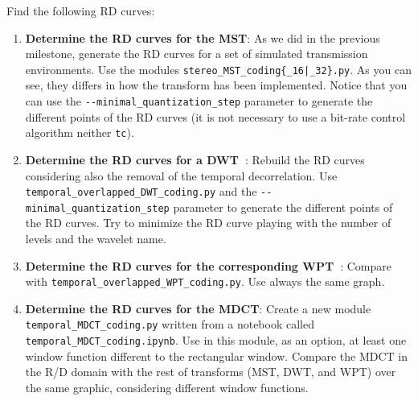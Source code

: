 
Find the following RD curves:

\begin{enumerate}

\item \textbf{Determine the RD curves for the MST}: As we did in the
  previous milestone, generate the RD curves for a set of simulated
  transmission environments. Use the modules
  \texttt{stereo\_MST\_coding\{\_16|\_32\}.py}. As you can see, they
  differs in how the transform has been implemented.  Notice that you
  can use the \verb|--minimal_quantization_step| parameter to generate
  the different points of the RD curves (it is not necessary to use a
  bit-rate control algorithm neither \texttt{tc}).

\item \textbf{Determine the RD curves for a
  DWT~\cite{lee2019pywavelets}}: Rebuild the RD curves considering
  also the removal of the temporal decorrelation. Use
  \verb|temporal_overlapped_DWT_coding.py| and the
  \verb|--minimal_quantization_step| parameter to generate the
  different points of the RD curves. Try to minimize the RD curve
  playing with the number of levels and the wavelet name.


\item \textbf{Determine the RD curves for the corresponding
  WPT~\cite{lee2019pywavelets}}: Compare with
  \verb|temporal_overlapped_WPT_coding.py|. Use always the same graph.

\item \textbf{Determine the RD curves for the MDCT}: Create a new
  module \verb|temporal_MDCT_coding.py| written from a notebook called
  \verb|temporal_MDCT_coding.ipynb|. Use in this module, as an option,
  at least one window function different to the rectangular
  window. Compare the MDCT in the R/D domain with the rest of
  transforms (MST, DWT, and WPT) over the same graphic, considering
  different window functions.
  
\end{enumerate}



  

